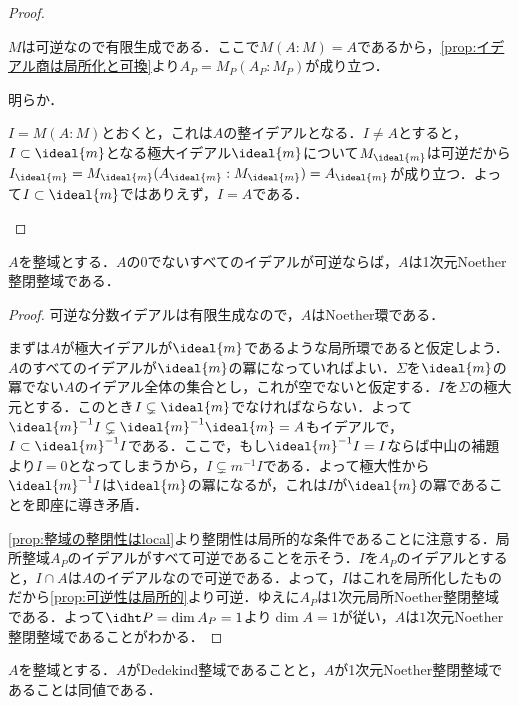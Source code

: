 \begin{proof}
	\begin{eqv}[3]
		\item $M$は可逆なので有限生成である．ここで$M(A:M)=A$であるから，\ref{prop:イデアル商は局所化と可換}より$A_P=M_P(A_P:M_P)$が成り立つ．
		\item 明らか．
		\item $I=M(A:M)$とおくと，これは$A$の整イデアルとなる．$I\neq A$とすると，$I\subset \ideal{m}$となる極大イデアル$\ideal{m}$について$M_{\ideal{m}}$は可逆だから$I_{\ideal{m}}=M_{\ideal{m}}(A_{\ideal{m}}:M_{\ideal{m}})=A_{\ideal{m}}$が成り立つ．よって$I\subset\ideal{m}$ではありえず，$I=A$である．
	\end{eqv}
\end{proof}


\begin{prop}\label{prop:すべてのイデアルが可逆ならば1-dimNoether整閉整域}
	$A$を整域とする．$A$の0でないすべてのイデアルが可逆ならば，$A$は1次元Noether整閉整域である．
\end{prop}

\begin{proof}
	可逆な分数イデアルは有限生成なので，$A$はNoether環である．
	
	まずは$A$が極大イデアルが$\ideal{m}$であるような局所環であると仮定しよう．$A$のすべてのイデアルが$\ideal{m}$の冪になっていればよい．$\Sigma$を$\ideal{m}$の冪でない$A$のイデアル全体の集合とし，これが空でないと仮定する．$I$を$\Sigma$の極大元とする．このとき$I\subsetneq\ideal{m}$でなければならない．よって$\ideal{m}^{-1}I\subsetneq \ideal{m}^{-1}\ideal{m}=A$もイデアルで，$I\subset \ideal{m}^{-1}I$である．ここで，もし$\ideal{m}^{-1}I=I$ならば中山の補題より$I=0$となってしまうから，$I\subsetneq m^{-1}I$である．よって極大性から$\ideal{m}^{-1}I$は$\ideal{m}$の冪になるが，これは$I$が$\ideal{m}$の冪であることを即座に導き矛盾．
	
	\ref{prop:整域の整閉性はlocal}より整閉性は局所的な条件であることに注意する．局所整域$A_P$のイデアルがすべて可逆であることを示そう．$I$を$A_P$のイデアルとすると，$I\cap A$は$A$のイデアルなので可逆である．よって，$I$はこれを局所化したものだから\ref{prop:可逆性は局所的}より可逆．ゆえに$A_P$は1次元局所Noether整閉整域である．よって$\idht P=\dim A_P=1$より$\dim A=1$が従い，$A$は$1$次元Noether整閉整域であることがわかる．
\end{proof}

\begin{thm}\label{thm:Dedekind同値条件}
	$A$を整域とする．$A$がDedekind整域であることと，$A$が1次元Noether整閉整域であることは同値である．
\end{thm}

